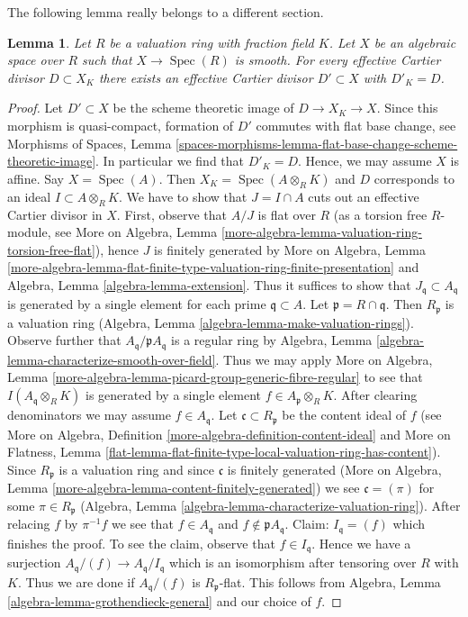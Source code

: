 \documentclass{stacks-project}
\theoremstyle{plain}
\newtheorem{lemma}[subsection]{Lemma}
\theoremstyle{definition}
\theoremstyle{remark}
\numberwithin{equation}{subsection}
\def\Spec{\mathop{\mathrm{Spec}}}
\begin{document}
\noindent
The following lemma really belongs to a different section.

\begin{lemma}
\label{lemma-smooth-over-valuation-ring-effective-Cartier}
Let $R$ be a valuation ring with fraction field $K$.
Let $X$ be an algebraic space over $R$ such that $X \to \Spec(R)$
is smooth. For every effective Cartier divisor $D \subset X_K$
there exists an effective Cartier divisor $D' \subset X$
with $D'_K = D$.
\end{lemma}

\begin{proof}
Let $D' \subset X$ be the scheme theoretic image of $D \to X_K \to X$.
Since this morphism is quasi-compact, formation of $D'$
commutes with flat base change, see
Morphisms of Spaces, Lemma
\ref{spaces-morphisms-lemma-flat-base-change-scheme-theoretic-image}.
In particular we find that $D'_K = D$. Hence,
we may assume $X$ is affine. Say $X = \Spec(A)$.
Then $X_K = \Spec(A \otimes_R K)$ and $D$ corresponds to
an ideal $I \subset A \otimes_R K$. We have to show that
$J = I \cap A$ cuts out an effective Cartier divisor in $X$.
First, observe that $A/J$ is flat over $R$ (as a torsion
free $R$-module, see More on Algebra, Lemma
\ref{more-algebra-lemma-valuation-ring-torsion-free-flat}),
hence $J$ is finitely generated by
More on Algebra, Lemma
\ref{more-algebra-lemma-flat-finite-type-valuation-ring-finite-presentation}
and
Algebra, Lemma \ref{algebra-lemma-extension}.
Thus it suffices to show that $J_\mathfrak q \subset A_\mathfrak q$
is generated by a single element for each prime $\mathfrak q \subset A$.
Let $\mathfrak p = R \cap \mathfrak q$. Then
$R_\mathfrak p$ is a valuation ring
(Algebra, Lemma \ref{algebra-lemma-make-valuation-rings}).
Observe further that $A_\mathfrak q/\mathfrak p A_\mathfrak q$
is a regular ring by Algebra, Lemma
\ref{algebra-lemma-characterize-smooth-over-field}.
Thus we may apply More on Algebra, Lemma
\ref{more-algebra-lemma-picard-group-generic-fibre-regular}
to see that $I(A_\mathfrak q \otimes_R K)$ is generated by
a single element $f \in A_\mathfrak p \otimes_R K$.
After clearing denominators we may assume $f \in A_\mathfrak q$.
Let $\mathfrak c \subset R_\mathfrak p$ be the content ideal of $f$
(see More on Algebra, Definition \ref{more-algebra-definition-content-ideal}
and More on Flatness, Lemma
\ref{flat-lemma-flat-finite-type-local-valuation-ring-has-content}).
Since $R_\mathfrak p$ is a valuation ring and
since $\mathfrak c$ is finitely generated
(More on Algebra, Lemma \ref{more-algebra-lemma-content-finitely-generated})
we see $\mathfrak c = (\pi)$ for some $\pi \in R_\mathfrak p$
(Algebra, Lemma \ref{algebra-lemma-characterize-valuation-ring}).
After relacing $f$ by $\pi^{-1}f$ we see that $f \in A_\mathfrak q$
and $f \not \in \mathfrak pA_\mathfrak q$.
Claim: $I_\mathfrak q = (f)$ which finishes the proof.
To see the claim, observe that $f \in I_\mathfrak q$.
Hence we have a surjection $A_\mathfrak q/(f) \to A_\mathfrak q/I_\mathfrak q$
which is an isomorphism after tensoring over $R$ with $K$.
Thus we are done if
$A_\mathfrak q/(f)$ is $R_\mathfrak p$-flat.
This follows from
Algebra, Lemma \ref{algebra-lemma-grothendieck-general}
and our choice of $f$.
\end{proof}
\end{document}
